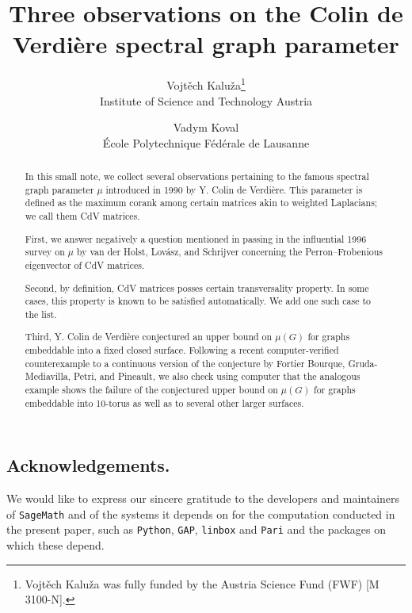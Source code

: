 \documentclass[12pt, dvipsnames]{article}
\author{Vojtěch Kaluža\thanks{Vojtěch Kaluža was fully funded by the Austria Science Fund (FWF) [M 3100-N].}
	\\ \small{Institute of Science and Technology Austria}
	\and Vadym Koval
	\\ \small{École Polytechnique Fédérale de Lausanne}}
\title{Three observations on the Colin de Verdière spectral graph parameter}
\date{}
\theoremstyle{plain}
\theoremstyle{plain}
\theoremstyle{remark}
\begin{document}
\maketitle


\begin{abstract}
In this small note, we collect several observations pertaining to the famous spectral graph parameter $\mu$ introduced in 1990 by Y. Colin de Verdière. This parameter is defined as the maximum corank among certain matrices akin to weighted Laplacians; we call them CdV matrices.

First, we answer negatively a question mentioned in passing in the influential 1996 survey on $\mu$ by van der Holst, Lovász, and Schrijver concerning the Perron--Frobenious eigenvector of CdV matrices.

Second, by definition, CdV matrices posses certain transversality property. In some cases, this property is known to be satisfied automatically. We add one such case to the list.

Third, Y. Colin de Verdière conjectured an upper bound on $\mu(G)$ for graphs embeddable into a fixed closed surface. Following a recent computer-verified counterexample to a continuous version of the conjecture by Fortier Bourque, Gruda-Mediavilla, Petri, and Pineault, we also check using computer that the analogous example shows the failure of the conjectured upper bound on $\mu(G)$ for graphs embeddable into 10-torus as well as to several other larger surfaces.
\end{abstract}








\subsection*{Acknowledgements.}
We would like to express our sincere gratitude to the developers and maintainers of \verb|SageMath| and of the systems it depends on for the computation conducted in the present paper, such as \verb|Python|, \verb|GAP|, \verb|linbox| and \verb|Pari| and the packages on which these depend.

\printbibliography
\end{document}
